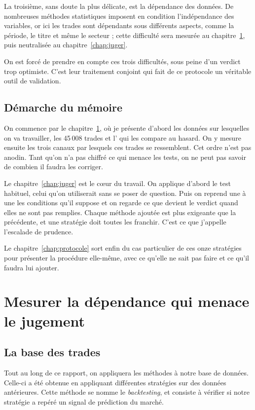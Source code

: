 La troisième, sans doute la plus délicate, est la dépendance
des données. De nombreuses méthodes statistiques
imposent en condition l'indépendance des variables, or ici les trades sont
dépendants sous différents aspects, comme la période, le titre et même le secteur ;
cette difficulté sera mesurée au chapitre~\ref{chap:donnees}, puis neutralisée
au chapitre~\ref{chap:juger}.

On est forcé de prendre en compte ces trois difficultés, sous peine
d'un verdict trop optimiste. C'est leur traitement conjoint qui fait de ce
protocole un véritable outil de validation.

\section*{Démarche du mémoire}
\label{sec:planification}


On commence par le chapitre~\ref{chap:donnees}, où je présente d'abord les
données sur lesquelles on va travailler, les 45\,008 trades et l'\edgevar{}
qui les compare au hasard. On y mesure ensuite les trois canaux par lesquels
ces trades se ressemblent. Cet ordre n'est pas anodin. Tant qu'on n'a pas
chiffré ce qui menace les tests, on ne peut pas savoir de combien il faudra
les corriger.

Le chapitre~\ref{chap:juger} est le cœur du travail. On applique d'abord le
test habituel, celui qu'on utiliserait sans se poser de question. Puis on
reprend une à une les conditions qu'il suppose et on regarde ce que devient le
verdict quand elles ne sont pas remplies. Chaque méthode ajoutée est plus
exigeante que la précédente, et une stratégie doit toutes les franchir. C'est
ce que j'appelle l'escalade de prudence.

Le chapitre~\ref{chap:protocole} sort enfin du cas particulier de ces onze
stratégies pour présenter la procédure elle-même, avec ce qu'elle ne sait pas
faire et ce qu'il faudra lui ajouter.
\chapter{Mesurer la dépendance qui menace le jugement}
\label{chap:donnees}

\section{La base des trades}
\label{sec:donnees-trades}


Tout au long de ce rapport, on appliquera les méthodes à notre base
de données. Celle-ci a été obtenue en appliquant différentes stratégies
sur des données antérieures. Cette méthode se nomme le \emph{backtesting}, et
consiste à vérifier si notre stratégie a repéré un signal de prédiction
du marché.

